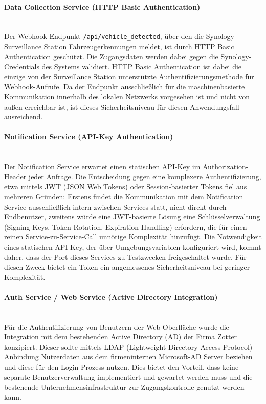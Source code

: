 \paragraph{Data Collection Service (HTTP Basic Authentication)}~\\
\label{sec:dc_auth}
Der Webhook-Endpunkt \texttt{/api/vehicle\_detected}, über den die Synology Surveillance Station Fahrzeugerkennungen meldet, ist durch HTTP Basic Authentication geschützt.
Die Zugangsdaten werden dabei gegen die Synology-Credentials des Systems validiert.
HTTP Basic Authentication ist dabei die einzige von der Surveillance Station unterstützte Authentifizierungsmethode für Webhook-Aufrufe.
Da der Endpunkt ausschließlich für die maschinenbasierte Kommunikation innerhalb des lokalen Netzwerks vorgesehen ist und nicht von außen erreichbar ist, ist dieses Sicherheitsniveau für diesen Anwendungsfall ausreichend.

\paragraph{Notification Service (API-Key Authentication)}~\\
\label{sec:notif_auth}
Der Notification Service erwartet einen statischen API-Key im Authorization-Header jeder Anfrage.
Die Entscheidung gegen eine komplexere Authentifizierung, etwa mittels JWT (JSON Web Tokens) oder Session-basierter Tokens fiel aus mehreren Gründen:
Erstens findet die Kommunikation mit dem Notification Service ausschließlich intern zwischen Services statt, nicht direkt durch Endbenutzer,
zweitens würde eine JWT-basierte Lösung eine Schlüsselverwaltung (Signing Keys, Token-Rotation, Expiration-Handling) erfordern, die für einen reinen Service-zu-Service-Call unnötige Komplexität hinzufügt.
Die Notwendigkeit eines statischen API-Key, der über Umgebungsvariablen konfiguriert wird, kommt daher, dass der Port dieses Services zu Testzwecken freigeschaltet wurde.
Für diesen Zweck bietet ein Token ein angemessenes Sicherheitsniveau bei geringer Komplexität.

\newpage
\paragraph{Auth Service / Web Service (Active Directory Integration)}~\\
Für die Authentifizierung von Benutzern der Web-Oberfläche wurde die Integration mit dem bestehenden Active Directory (AD) der Firma Zotter konzipiert.
Dieser sollte mittels LDAP (Lightweight Directory Access Protocol)-Anbindung Nutzerdaten aus dem firmeninternen Microsoft-AD Server beziehen und diese für den Login-Prozess nutzen.
Dies bietet den Vorteil, dass keine separate Benutzerverwaltung implementiert und gewartet werden muss und die bestehende Unternehmensinfrastruktur zur Zugangskontrolle genutzt werden kann.



